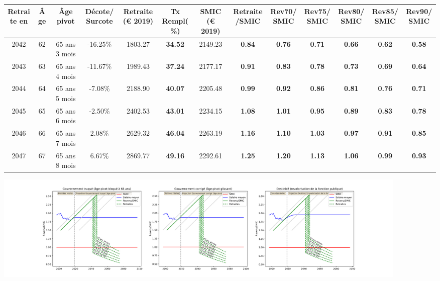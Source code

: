 { \scriptsize \begin{center} 
\begin{tabular}[htb]{|c|c||c|c||c|c||c||c|c|c|c|c|c|} 
\hline 
 Retraite en &  Âge &  Âge pivot &  Décote/Surcote &  Retraite (\euro{} 2019) &  Tx Rempl(\%) &  SMIC (\euro{} 2019) &  Retraite/SMIC &  Rev70/SMIC &  Rev75/SMIC &  Rev80/SMIC &  Rev85/SMIC &  Rev90/SMIC \\ 
\hline \hline 
 2042 &  62 &  65 ans 3 mois &  -16.25\% &  1803.27 &  {\bf 34.52} &  2149.23 &  {\bf {\color{red} 0.84}} &  {\bf {\color{red} 0.76}} &  {\bf {\color{red} 0.71}} &  {\bf {\color{red} 0.66}} &  {\bf {\color{red} 0.62}} &  {\bf {\color{red} 0.58}} \\ 
\hline 
 2043 &  63 &  65 ans 4 mois &  -11.67\% &  1989.43 &  {\bf 37.24} &  2177.17 &  {\bf {\color{red} 0.91}} &  {\bf {\color{red} 0.83}} &  {\bf {\color{red} 0.78}} &  {\bf {\color{red} 0.73}} &  {\bf {\color{red} 0.69}} &  {\bf {\color{red} 0.64}} \\ 
\hline 
 2044 &  64 &  65 ans 5 mois &  -7.08\% &  2188.90 &  {\bf 40.07} &  2205.48 &  {\bf {\color{red} 0.99}} &  {\bf {\color{red} 0.92}} &  {\bf {\color{red} 0.86}} &  {\bf {\color{red} 0.81}} &  {\bf {\color{red} 0.76}} &  {\bf {\color{red} 0.71}} \\ 
\hline 
 2045 &  65 &  65 ans 6 mois &  -2.50\% &  2402.53 &  {\bf 43.01} &  2234.15 &  {\bf 1.08} &  {\bf 1.01} &  {\bf {\color{red} 0.95}} &  {\bf {\color{red} 0.89}} &  {\bf {\color{red} 0.83}} &  {\bf {\color{red} 0.78}} \\ 
\hline 
 2046 &  66 &  65 ans 7 mois &  2.08\% &  2629.32 &  {\bf 46.04} &  2263.19 &  {\bf 1.16} &  {\bf 1.10} &  {\bf 1.03} &  {\bf {\color{red} 0.97}} &  {\bf {\color{red} 0.91}} &  {\bf {\color{red} 0.85}} \\ 
\hline 
 2047 &  67 &  65 ans 8 mois &  6.67\% &  2869.77 &  {\bf 49.16} &  2292.61 &  {\bf 1.25} &  {\bf 1.20} &  {\bf 1.13} &  {\bf 1.06} &  {\bf {\color{red} 0.99}} &  {\bf {\color{red} 0.93}} \\ 
\hline 
\hline 
\end{tabular} 
\end{center} } 

 \begin{center}\includegraphics[width=0.9\textwidth]{fig/Ascendant1525_1980_22_dest_retraite.pdf}\end{center} \label{fig/Ascendant1525_1980_22_dest_retraite.pdf} 

